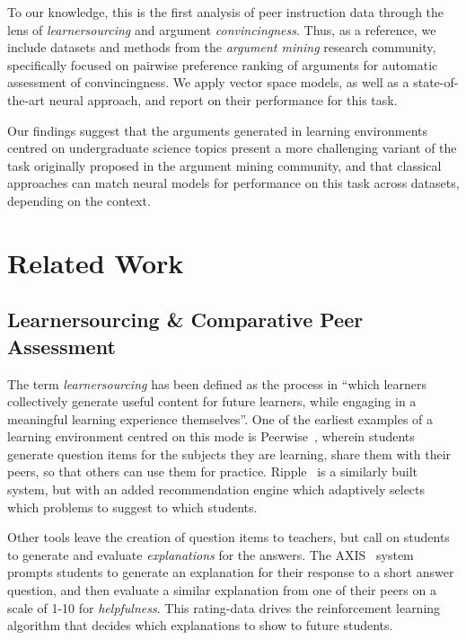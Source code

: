 \documentclass[runningheads]{llncs}
\begin{document}
To our knowledge, this is the first analysis of peer instruction data through 
the lens of \textit{learnersourcing} and argument \textit{convincingness}.
Thus, as a reference, we include datasets and methods from the \textit{argument 
mining} research community, specifically focused on pairwise preference ranking 
of arguments for automatic assessment of convincingness.
We apply vector space models, as well as a state-of-the-art neural approach, 
and report on their performance for this task.

Our findings suggest that the arguments generated in learning environments 
centred on undergraduate science topics present a more challenging variant of 
the task originally proposed in the argument mining community, and that 
classical approaches can match neural models for performance on this task 
across datasets, depending on the context.

\section{Related Work}


\subsection{Learnersourcing \& Comparative Peer Assessment}
The term \textit{learnersourcing} has been defined as the process in ``which 
learners collectively generate useful content for future learners, while 
engaging in a meaningful learning experience  
themselves''\cite{weir_learnersourcing_2015}.
One of the earliest examples of a learning environment centred on this mode is  
Peerwise~\cite{denny_peerwise:_2008}, wherein students generate question items 
for the subjects they are learning, share them with their peers, so that others 
can use them for practice. 
Ripple~\cite{khosravi_ripple_2019} is a similarly built system, but with an 
added recommendation engine which adaptively selects which problems to suggest 
to which students.

Other tools leave the creation of question items to teachers, but call on 
students to generate and evaluate \textit{explanations} for the answers.
The AXIS~\cite{williams_axis:_2016} system prompts students to
generate an explanation for their response to a short answer question, and then 
evaluate a similar explanation from one of their peers on a scale of 1-10 for 
\textit{helpfulness}. This rating-data drives the reinforcement learning 
algorithm that decides which explanations to show to future students.
\end{document}
